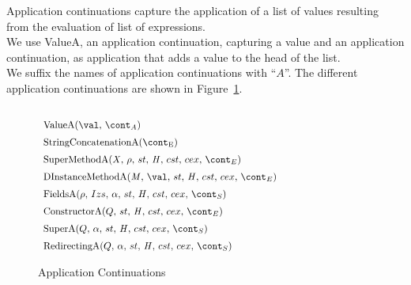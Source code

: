 \documentclass{article}
\newcounter{rowcount}[figure]
\newcounter{figurecount}
\newcommand{\myrowcount}{\refstepcounter{rowcount}\thesubsection.\thefigurecount.\therowcount}
\newcommand{\labeledrow}[1]{\myrowcount\label{#1}}
\begin{document}
Application continuations capture the application of a list of values resulting from the evaluation of list of expressions.\\
We use ValueA, an application continuation, capturing a value and an application continuation, as application that adds a value to the head of the list.\\
We suffix the names of application continuations with ``$A$''.
The different application continuations are shown in Figure~\ref{figure:acont}.
\newcommand{\ValueA}[2]{\mathrm{ValueA}({#1},\,{#2})}
\newcommand{\StringConcatenationA}{\mathrm{StringConcatenationA(\econt)}}
\newcommand{\SuperMethodA}{\mathrm{SuperMethodA}(\idmeta,\,\env,\,\ExceptionHandlers,\,\econt)}
\newcommand{\StaticInvA}[4]{\mathrm{StaticInvocationA}({#1},\,{#2},\,{#3},\,\ExceptionHandlersRest,\,{#4})}
\newcommand{\DInstanceMethodA}{\mathrm{DInstanceMethodA}(\membermeta,\,\val,\,\ExceptionHandlers,\,\econt)}
\newcommand{\FieldsA}[4]{\mathrm{FieldsA}({#1},\,{#2},\,{#3},\,\strace,\,\handler,\,\cstrace,\,\cex,\,{#4})}
\newcommand{\SuperA}[3]{\mathrm{SuperA}({#1},\,{#2},\,\strace,\,\handler,\,\cstrace,\,\cex,\,{#3})}
\newcommand{\ConstructorA}[2]{\mathrm{ConstructorA}({#1},\,\strace,\,\handler,\,\cstrace,\,\cex,\,{#2})}
\newcommand{\RedirectingA}[3]{\mathrm{RedirectingA}({#1},\,{#2},\,\strace,\,\handler,\,\cstrace,\,\cex,\,{#3})}
%
%
\begin{figure}[Htp]
  $
  \begin{array}{lll@{\hspace{5cm}}}
  	&&\\
	\ValueA{\val}{\acont}&\\[2mm]

	\StringConcatenationA&\\[2mm]

	\SuperMethodA&\\[2mm]

	\DInstanceMethodA&\\[2mm]

	\FieldsA{\env}{Izs}{\loc}{\scont}\\[2mm]

	\ConstructorA{Q}{\econt}\\[2mm]

	\SuperA{Q}{\loc}{\scont}\\[2mm]

	\RedirectingA{Q}{\loc}{\scont}
  \end{array}
  $
  \caption{Application Continuations}
  \label{figure:acont}
\end{figure}
\end{document}
